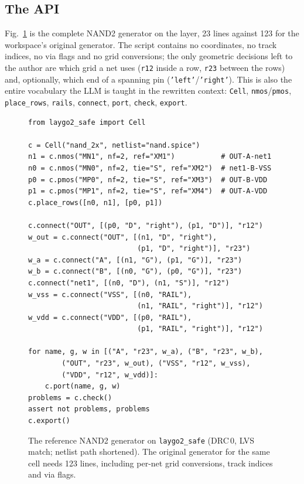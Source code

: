 \documentclass[conference]{IEEEtran}
\newcommand{\code}[1]{\texttt{#1}}
\begin{document}
\subsection{The API}
Fig.~\ref{fig:code} is the complete NAND2 generator on the layer, 23 lines against 123 for the workspace's original generator. The script contains no coordinates, no track indices, no via flags and no grid conversions; the only geometric decisions left to the author are which grid a net uses (\code{r12} inside a row, \code{r23} between the rows) and, optionally, which end of a spanning pin (\code{'left'}/\code{'right'}). This is also the entire vocabulary the LLM is taught in the rewritten context: \code{Cell}, \code{nmos}/\code{pmos}, \code{place\_rows}, \code{rails}, \code{connect}, \code{port}, \code{check}, \code{export}.

\begin{figure}[t]
\begin{lstlisting}
from laygo2_safe import Cell

c = Cell("nand_2x", netlist="nand.spice")
n1 = c.nmos("MN1", nf=2, ref="XM1")           # OUT-A-net1
n0 = c.nmos("MN0", nf=2, tie="S", ref="XM2")  # net1-B-VSS
p0 = c.pmos("MP0", nf=2, tie="S", ref="XM3")  # OUT-B-VDD
p1 = c.pmos("MP1", nf=2, tie="S", ref="XM4")  # OUT-A-VDD
c.place_rows([n0, n1], [p0, p1])

c.connect("OUT", [(p0, "D", "right"), (p1, "D")], "r12")
w_out = c.connect("OUT", [(n1, "D", "right"),
                          (p1, "D", "right")], "r23")
w_a = c.connect("A", [(n1, "G"), (p1, "G")], "r23")
w_b = c.connect("B", [(n0, "G"), (p0, "G")], "r23")
c.connect("net1", [(n0, "D"), (n1, "S")], "r12")
w_vss = c.connect("VSS", [(n0, "RAIL"),
                          (n1, "RAIL", "right")], "r12")
w_vdd = c.connect("VDD", [(p0, "RAIL"),
                          (p1, "RAIL", "right")], "r12")

for name, g, w in [("A", "r23", w_a), ("B", "r23", w_b),
        ("OUT", "r23", w_out), ("VSS", "r12", w_vss),
        ("VDD", "r12", w_vdd)]:
    c.port(name, g, w)
problems = c.check()
assert not problems, problems
c.export()
\end{lstlisting}
\caption{The reference NAND2 generator on \code{laygo2\_safe} (DRC\,0, LVS match; netlist path shortened). The original generator for the same cell needs 123 lines, including per-net grid conversions, track indices and via flags.}
\label{fig:code}
\end{figure}
\end{document}
